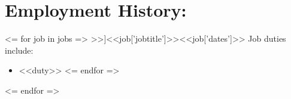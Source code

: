 \documentclass{resume}
\begin{document}
\begin{comment}

New section, trying it out
Currently canning this section but THAT'S OKAY
\section*{\underline{\textit{Projects:}}}
\large\textit{Super Four-Bar Explorer \hfill December 2008}\normalsize
\small\begin{itemize}
\item A program written in python that uses a Gauss-Newton unconstrained optimization algorithm to fit the path traced by a four bar linkage to a given set of points
\item Accompanied by a spreadsheet that illustrates four-bar linkage traced paths
\end{itemize}\normalsize\medskip

Another new section, recommended by Career Services. At worst, I have the
wording for it, amirite?
\section*{\underline{\textit{Service:}}}
\tiny\begin{enumerate}
\item Administered the web site and Facebook page for ASME's UAF student chapter \hfill 2009--2010
\item Volunteered at the UAF College of Engineering and Mines' Engineer's Week Open House \hfill February 2010
\end{enumerate}\normalsize

\large\textit{Society of Automotive Engineers, UAF
Chapter\hfill2009}\normalsize\\
\textit{Treasurer}
\end{comment}

\section{Employment History:}

<= for job in jobs =>
    \affiliation[<<job['employername']>>]{<<job['jobtitle']>>}{<<job['dates']>>}\normalsize
    Job duties include:
    \small\begin{itemize}
    <= for duty in job['duties'] =>
        \item <<duty>>
    <= endfor =>
    \end{itemize}\normalsize
    \medskip
<= endfor =>
\end{document}
